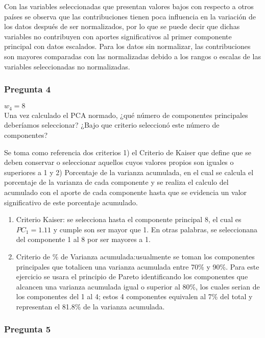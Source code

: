\documentclass[
]{article}
\begin{document}
Con las variables seleccionadas que presentan valores bajos con respecto
a otros países se observa que las contribuciones tienen poca influencia
en la variación de los datos después de ser normalizados, por lo que se
puede decir que dichas variables no contribuyen con aportes
significativos al primer componente principal con datos escalados. Para
los datos sin normalizar, las contribuciones son mayores comparadas con
las normalizadas debido a los rangos o escalas de las variables
seleccionadas no normalizadas.

\subsubsection{Pregunta 4}\label{pregunta-4}

\(w_4=8\)\\
Una vez calculado el PCA normado, ¿qué número de componentes principales
deberíamos seleccionar? ¿Bajo que criterio seleccionó este número de
componentes?

Se toma como referencia dos criterios 1) el Criterio de Kaiser que
define que se deben conservar o seleccionar aquellos cuyos valores
propios son iguales o superiores a 1 y 2) Porcentaje de la varianza
acumulada, en el cual se calcula el porcentaje de la varianza de cada
componente y se realiza el calculo del acumulado con el aporte de cada
componente hasta que se evidencia un valor significativo de este
porcentaje acumulado.

\begin{enumerate}
\def\labelenumi{\arabic{enumi})}
\item
  Criterio Kaiser: se selecciona hasta el componente principal 8, el
  cual es \(PC_1=1.11\) y cumple son ser mayor que 1. En otras palabras,
  se seleccionana del componente 1 al 8 por ser mayores a 1.
\item
  Criterio de \% de Varianza acumulada:usualmente se toman los
  componentes principales que totalicen una varianza acumulada entre
  70\% y 90\%. Para este ejercicio se usara el principio de Pareto
  identificando los componentes que alcancen una varianza acumulada
  igual o superior al 80\%, los cuales serian de los componentes del 1
  al 4; estos 4 componentes equivalen al 7\% del total y representan el
  81.8\% de la varianza acumulada.
\end{enumerate}

\subsubsection{Pregunta 5}\label{pregunta-5}
\end{document}
